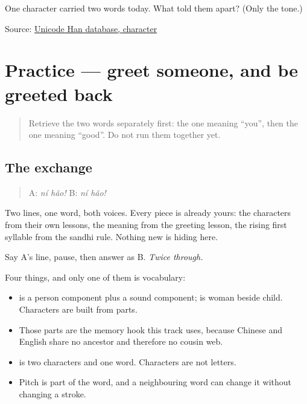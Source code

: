 \begin{tcolorbox}[breakable,colback=teal!4,colframe=teal!35!black,title={Before you move on}]
One character carried two words today. What told them apart? (Only the tone.)

Source: \href{https://www.unicode.org/charts/PDF/U4E00.pdf}{Unicode Han database, character }
\end{tcolorbox}
\section[Practice]{Practice — greet someone, and be greeted back}

\label{lesson:ZH-C01-practice}



\begin{quote}
Retrieve the two words separately first: the one meaning \textquotedblleft{}you\textquotedblright{}, then the one meaning \textquotedblleft{}good\textquotedblright{}. Do not run them together yet.
\end{quote}

\subsection*{The exchange}
\begin{quote}
A: \textbf{} \emph{ní hǎo!} B: \textbf{} \emph{ní hǎo!}
\end{quote}

Two lines, one word, both voices. Every piece is already yours: the characters from their own lessons, the meaning from the greeting lesson, the rising first syllable from the sandhi rule. Nothing new is hiding here.

Say A's line, pause, then answer as B. \emph{Twice through.}

\begin{grammarlens}[title={What you've built this chapter}]
Four things, and only one of them is vocabulary:

\begin{itemize}
\raggedright
  \item \textbf{} is a person component plus a sound component; \textbf{} is woman beside child. Characters are built from parts.
  \item Those parts are the memory hook this track uses, because Chinese and English share no ancestor and therefore no cousin web.
  \item \textbf{} is two characters and one word. Characters are not letters.
  \item Pitch is part of the word, and a neighbouring word can change it without changing a stroke.
\end{itemize}
\end{grammarlens}

